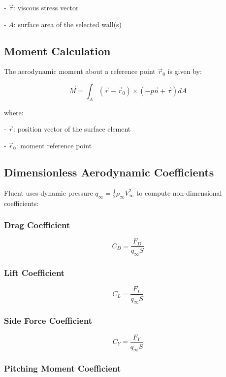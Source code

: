 \documentclass[12pt]{article}
\begin{document}
- $ \vec{\tau} $: viscous stress vector
    
- $ A $: surface area of the selected wall(s)


\subsection{Moment Calculation}
The aerodynamic moment about a reference point $\vec{r}_0$ is given by:

$$
\vec{M} = \int_{A} \left( \vec{r} - \vec{r}_0 \right) \times \left( -p \vec{n} + \vec{\tau} \right) dA
$$

where:
    
- $ \vec{r} $: position vector of the surface element
    
- $ \vec{r}_0 $: moment reference point

\subsection{Dimensionless Aerodynamic Coefficients}
Fluent uses dynamic pressure $ q_\infty = \frac{1}{2} \rho_\infty V_\infty^2 $ to compute non-dimensional coefficients:

\subsubsection*{Drag Coefficient}

$$
C_D = \frac{F_D}{q_\infty S}
$$

\subsubsection*{Lift Coefficient}

$$
C_L = \frac{F_L}{q_\infty S}
$$

\subsubsection*{Side Force Coefficient}

$$
C_Y = \frac{F_Y}{q_\infty S}
$$

\subsubsection*{Pitching Moment Coefficient}
\end{document}
